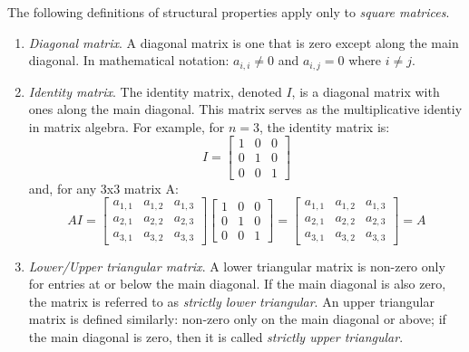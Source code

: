 \noindent The following definitions of structural properties apply only to \emph{square matrices}.
\begin{enumerate}[resume]

\item \emph{Diagonal matrix}.  A diagonal matrix is one that is zero except along the main diagonal. In mathematical notation: $a_{i,i} \ne 0 $ and $a_{i,j} = 0$ where $i \ne j$.

\item \emph{Identity matrix}.  The identity matrix, denoted $I$, is a diagonal matrix with ones along the main diagonal.  This matrix serves as the multiplicative identiy in matrix algebra.  For example, for $n=3$, the identity matrix is:
\begin{equation*}
I = \left[
\begin{matrix}
1 & 0 & 0 \\
0 & 1 & 0 \\
0 & 0 & 1
\end{matrix}
\right]
\end{equation*}
and, for any 3x3 matrix A:
\begin{equation*}
AI = \left[
\begin{matrix}
a_{1,1} & a_{1,2} & a_{1,3} \\
a_{2,1} & a_{2,2} & a_{2,3} \\
a_{3,1} & a_{3,2} & a_{3,3}
\end{matrix}
\right]
\left[
\begin{matrix}
1 & 0 & 0 \\
0 & 1 & 0 \\
0 & 0 & 1
\end{matrix}
\right]
=
\left[
\begin{matrix}
a_{1,1} & a_{1,2} & a_{1,3} \\
a_{2,1} & a_{2,2} & a_{2,3} \\
a_{3,1} & a_{3,2} & a_{3,3}
\end{matrix}
\right]
= 
A
\end{equation*}

\item \emph{Lower/Upper triangular matrix}.  A lower triangular matrix is non-zero only for entries at or below the main diagonal.  If the main diagonal is also zero, the matrix is referred to as \emph{strictly lower triangular}.  An upper triangular matrix is defined similarly: non-zero only on the main diagonal or above; if the main diagonal is zero, then it is called \emph{strictly upper triangular}.
\end{enumerate}

